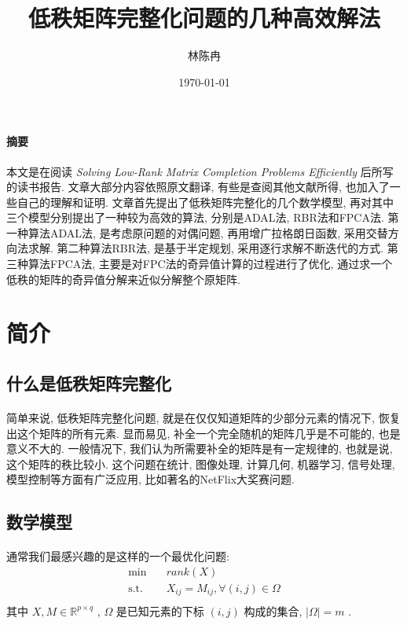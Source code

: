 \documentclass[a4paper, UTF8]{ctexart}				%
\title{低秩矩阵完整化问题的几种高效解法}
\author{林陈冉}
\date{\today}
\numberwithin{equation}{section}				%
\newcommand{\upcite}[1]{\textsuperscript{\textsuperscript{\cite{#1}}}}
\begin{document}
	\maketitle										%
	\paragraph{摘要}本文是在阅读 {\it Solving Low-Rank Matrix Completion Problems Efficiently}\upcite{goldfarb2009solving} 后所写的读书报告. 文章大部分内容依照原文翻译, 有些是查阅其他文献所得, 也加入了一些自己的理解和证明. 文章首先提出了低秩矩阵完整化的几个数学模型, 再对其中三个模型分别提出了一种较为高效的算法, 分别是ADAL法, RBR法和FPCA法. 第一种算法ADAL法, 是考虑原问题的对偶问题, 再用增广拉格朗日函数, 采用交替方向法求解. 第二种算法RBR法, 是基于半定规划, 采用逐行求解不断迭代的方式. 第三种算法FPCA法, 主要是对FPC法的奇异值计算的过程进行了优化, 通过求一个低秩的矩阵的奇异值分解来近似分解整个原矩阵.
	\section{简介}
		\subsection{什么是低秩矩阵完整化}
			\paragraph{}
				\quad 简单来说, 低秩矩阵完整化问题, 就是在仅仅知道矩阵的少部分元素的情况下, 恢复出这个矩阵的所有元素. 显而易见, 补全一个完全随机的矩阵几乎是不可能的, 也是意义不大的. 一般情况下, 我们认为所需要补全的矩阵是有一定规律的, 也就是说, 这个矩阵的秩比较小. 这个问题在统计, 图像处理, 计算几何, 机器学习, 信号处理, 模型控制等方面有广泛应用, 比如著名的NetFlix大奖赛问题.

		\subsection{数学模型}
			\paragraph{}
				\quad 通常我们最感兴趣的是这样的一个最优化问题:
				\begin{equation}
					\begin{split}\label{q1}
						\min \quad
							& rank(X)\\
						\text{s.t.} \quad
							& X_{ij}=M_{ij},\forall(i,j)\in\Omega\\
					\end{split}
				\end{equation}
				其中 $X, M\in\mathbb{R}^{p \times q}$ , $\Omega$ 是已知元素的下标 $(i, j)$ 构成的集合, $\lvert{\Omega}\rvert = m$ .
\end{document}
